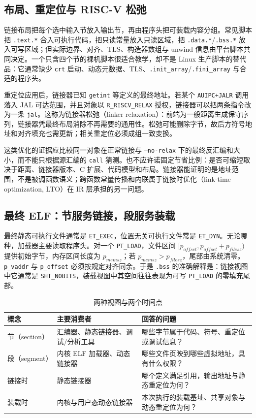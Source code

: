 \subsection{布局、重定位与 RISC-V 松弛}

链接布局把每个选中输入节放入输出节，再由程序头把可装载内容分组。常见脚本把 \texttt{.text.*} 合入可执行代码，把只读常量放入只读区域，把 \texttt{.data.*}/\texttt{.bss.*} 放入可写区域；但实际边界、对齐、TLS、构造器数组与 unwind 信息由平台脚本共同决定。一个只含四个节的裸机脚本很适合教学，却不是 Linux 生产脚本的替代品：它通常缺少 \texttt{crt} 启动、动态元数据、TLS、\texttt{.init\_array}/\texttt{.fini\_array} 与合适的程序头。

重定位应用后，链接器已知 \texttt{getint} 等定义的最终地址。若某个 \texttt{AUIPC+JALR} 调用落入 JAL 可达范围，并且对象以 \texttt{R\_RISCV\_RELAX} 授权，链接器可以把两条指令改为一条 \texttt{jal}。这称为链接器松弛（linker relaxation）：前端为一般距离生成保守序列，链接器凭最终布局消除不再需要的通用性\cite{bin-riscv-psabi-relax}。松弛可能删除字节，故后方符号地址和对齐填充也需更新；相关重定位必须成组一致变换。

这类优化的证据应比较同一对象在正常链接与 \texttt{--no-relax} 下的最终反汇编和大小，而不能只根据源汇编的 \texttt{call} 猜测。也不应许诺固定节省比例：是否可缩短取决于距离、链接器版本、C 扩展、代码模型和布局。链接器能证明的是地址范围，不是被调函数语义；跨函数常量传播和内联属于链接时优化（link-time optimization, LTO）在 IR 层承担的另一问题。

\subsection{最终 ELF：节服务链接，段服务装载}

最终静态可执行文件通常是 \texttt{ET\_EXEC}，位置无关可执行文件常是 \texttt{ET\_DYN}。无论哪种，加载器主要读取程序头。对一个 \texttt{PT\_LOAD}，文件区间 \([p_{offset},p_{offset}+p_{filesz})\) 提供初始字节，内存区间长度为 \(p_{memsz}\)；若 \(p_{memsz}>p_{filesz}\)，尾部由系统清零。\texttt{p\_vaddr} 与 \texttt{p\_offset} 必须按规定对齐同余\cite{bin-sysv-gabi}。于是 \texttt{.bss} 的准确解释是：链接视图中它通常是 \texttt{SHT\_NOBITS}，装载视图中其空间往往表现为可写 \texttt{PT\_LOAD} 的零填充尾部。

\begin{table}[t]
\caption{两种视图与两个时间点}
\label{tab:section-segment}
\centering
\small
\begin{tabular}{p{.19\linewidth}p{.33\linewidth}p{.37\linewidth}}
\toprule
概念 & 主要消费者 & 回答的问题\\
\midrule
节（section） & 汇编器、静态链接器、调试/分析工具 & 哪些字节属于代码、符号、重定位或调试信息？\\
段（segment） & 内核 ELF 加载器、动态链接器 & 哪些文件页映到哪些虚拟地址，具有什么权限？\\
链接时 & 静态链接器 & 哪个定义满足引用，输出地址与静态重定位为何？\\
装载时 & 内核与用户态动态链接器 & 本次执行的装载基址、共享对象与动态重定位为何？\\
\bottomrule
\end{tabular}
\end{table}

